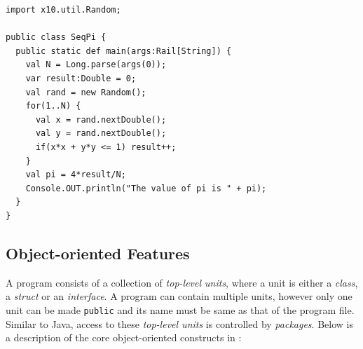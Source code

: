 \begin{lstlisting}[caption={Sequential \xten program to calculate value of $\pi$
using Monte Carlo method},label={lst:x10simple},language=x10,numbers=none]
import x10.util.Random;

public class SeqPi {
  public static def main(args:Rail[String]) {
    val N = Long.parse(args(0));
    var result:Double = 0;
    val rand = new Random();
    for(1..N) {
      val x = rand.nextDouble();
      val y = rand.nextDouble();
      if(x*x + y*y <= 1) result++;
    }
    val pi = 4*result/N;
    Console.OUT.println("The value of pi is " + pi);
  }
}

\end{lstlisting}
\subsection{Object-oriented Features}

A program consists of a collection of \emph{top-level units}, where a unit is
either a \emph{class}, a \emph{struct} or an \emph{interface}. A program can
contain multiple units, however only one unit can be made \texttt{public} and
its name must be same as that of the program file. Similar to Java, access to
these \emph{top-level units} is controlled by \emph{packages}. Below is a
description of the core object-oriented constructs in \xten: 

